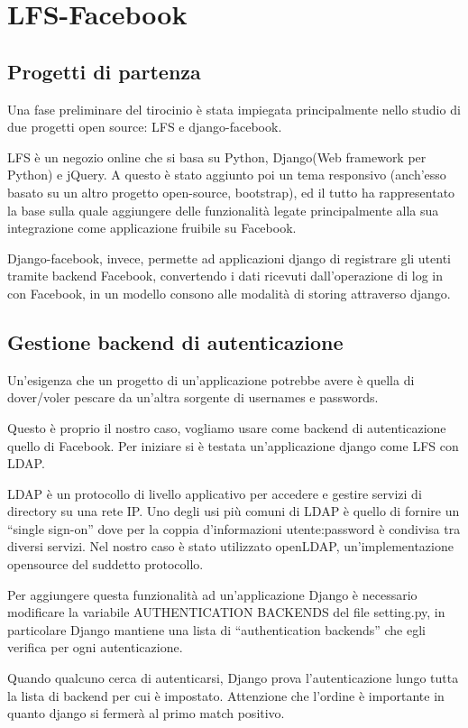 \chapter{LFS-Facebook}
 
\section{Progetti di partenza}
Una fase preliminare del tirocinio è stata impiegata principalmente nello studio di due progetti open source: LFS e django-facebook.

LFS è un negozio online che  si basa su Python, Django(Web framework per Python) e jQuery. A questo è stato aggiunto poi un tema responsivo (anch'esso basato su un altro progetto open-source, bootstrap), ed il tutto ha rappresentato la base sulla quale aggiungere delle funzionalità legate principalmente alla sua integrazione come applicazione fruibile su Facebook. 

Django-facebook, invece, permette ad applicazioni django di registrare gli utenti tramite backend Facebook, convertendo i dati ricevuti dall'operazione di log in con Facebook, in un modello consono alle modalità di storing attraverso django.

\section{Gestione backend di autenticazione}
Un'esigenza che un progetto di un'applicazione potrebbe avere è quella di dover/voler pescare da un'altra sorgente di usernames e passwords.

Questo è proprio il nostro caso, vogliamo usare come backend di autenticazione quello di Facebook.
Per iniziare si è testata un'applicazione django come LFS con LDAP. 

LDAP è un protocollo di livello applicativo per accedere e gestire servizi di directory su una rete IP. Uno degli usi più comuni di LDAP è quello di fornire un “single sign-on” dove per la coppia d'informazioni utente:password è condivisa tra diversi servizi.
Nel nostro caso è stato utilizzato openLDAP, un'implementazione opensource del suddetto protocollo.

Per aggiungere questa funzionalità ad un'applicazione Django è necessario modificare la variabile AUTHENTICATION BACKENDS del file setting.py, in particolare Django mantiene una lista di “authentication backends” che egli verifica per ogni autenticazione. 

Quando qualcuno cerca di autenticarsi, Django prova l'autenticazione lungo tutta la lista di backend per cui è impostato. 
Attenzione che l'ordine è importante in quanto django si fermerà al primo match positivo.

